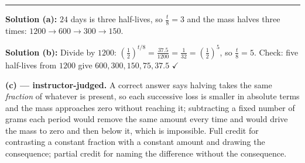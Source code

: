 \documentclass[12pt]{article}
\begin{document}
\vspace{0.2cm}\noindent\rule{\linewidth}{0.2pt}


\textbf{Solution (a):} $24$ days is three half-lives, so $\frac{t}{8} = 3$ and the mass halves three times: $1200 \to 600 \to 300 \to 150$. 

\textbf{Solution (b):} Divide by $1200$: $\left(\frac{1}{2}\right)^{t/8} = \frac{37.5}{1200} = \frac{1}{32} = \left(\frac{1}{2}\right)^{5}$, so $\frac{t}{8} = 5$. Check: five half-lives from $1200$ give $600, 300, 150, 75, 37.5$ $\checkmark$ 

\textbf{(c) --- instructor-judged.} A correct answer says halving takes the same \emph{fraction} of whatever is present, so each successive loss is smaller in absolute terms and the mass approaches zero without reaching it; subtracting a fixed number of grams each period would remove the same amount every time and would drive the mass to zero and then below it, which is impossible. Full credit for contrasting a constant fraction with a constant amount and drawing the consequence; partial credit for naming the difference without the consequence.
\end{document}
